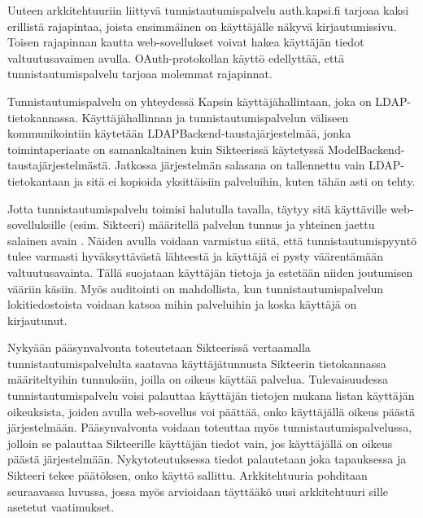 Uuteen arkkitehtuuriin liittyvä tunnistautumispalvelu auth.kapsi.fi tarjoaa kaksi erillistä rajapintaa, joista ensimmäinen on käyttäjälle näkyvä kirjautumissivu. Toisen rajapinnan kautta web-sovellukset voivat hakea käyttäjän tiedot valtuutusavaimen avulla. OAuth-protokollan käyttö edellyttää, että tunnistautumispalvelu tarjoaa molemmat rajapinnat.

Tunnistautumispalvelu on yhteydessä Kapsin käyttäjähallintaan, joka on LDAP-tietokannassa. Käyttäjähallinnan ja tunnistautumispalvelun väliseen kommunikointiin käytetään LDAPBack\-end-taustajärjestelmää, jonka toimintaperiaate on samankaltainen kuin Sikteerissä käytetyssä ModelBackend-taustajärjestelmästä. Jatkossa järjestelmän salasana on tallennettu vain LDAP-tietokantaan ja sitä ei kopioida yksittäisiin palveluihin, kuten tähän asti on tehty.

Jotta tunnistautumispalvelu toimisi halutulla tavalla, täytyy sitä käyttäville web-sovelluksille (esim. Sikteeri) määritellä palvelun tunnus ja yhteinen jaettu salainen avain \cite{oauth2_0}. Näiden avulla voidaan varmistua siitä, että tunnistautumispyyntö tulee varmasti hyväksyttävästä lähteestä ja käyttäjä ei pysty väärentämään valtuutusavainta. Tällä suojataan käyttäjän tietoja ja estetään niiden joutumisen vääriin käsiin. Myös auditointi on mahdollista, kun tunnistautumispalvelun lokitiedostoista voidaan katsoa mihin palveluihin ja koska käyttäjä on kirjautunut.

Nykyään pääsynvalvonta toteutetaan Sikteerissä vertaamalla tunnistautumispalvelulta saatavaa käyttäjätunnusta Sikteerin tietokannassa määriteltyihin tunnuksiin, joilla on oikeus käyttää palvelua. Tulevaisuudessa tunnistautumispalvelu voisi palauttaa käyttäjän tietojen mukana listan käyttäjän oikeuksista, joiden avulla web-sovellus voi päättää, onko käyttäjällä oikeus päästä järjestelmään. Pääsynvalvonta voidaan toteuttaa myös tunnistautumispalvelussa, jolloin se palauttaa Sikteerille käyttäjän tiedot vain, jos käyttäjällä on oikeus päästä järjestelmään. Nykytoteutuksessa tiedot palautetaan joka tapauksessa ja Sikteeri tekee päätöksen, onko käyttö sallittu. Arkkitehtuuria pohditaan seuraavassa luvussa, jossa myös arvioidaan täyttääkö uusi arkkitehtuuri sille asetetut vaatimukset.